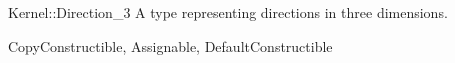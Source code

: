 \begin{ccRefConcept}{Kernel::Direction_3}
A type representing directions in three dimensions.

\ccRefines
CopyConstructible, Assignable, DefaultConstructible

\ccSeeAlso
{} \\
 \\
  \\
 \\

\end{ccRefConcept}
